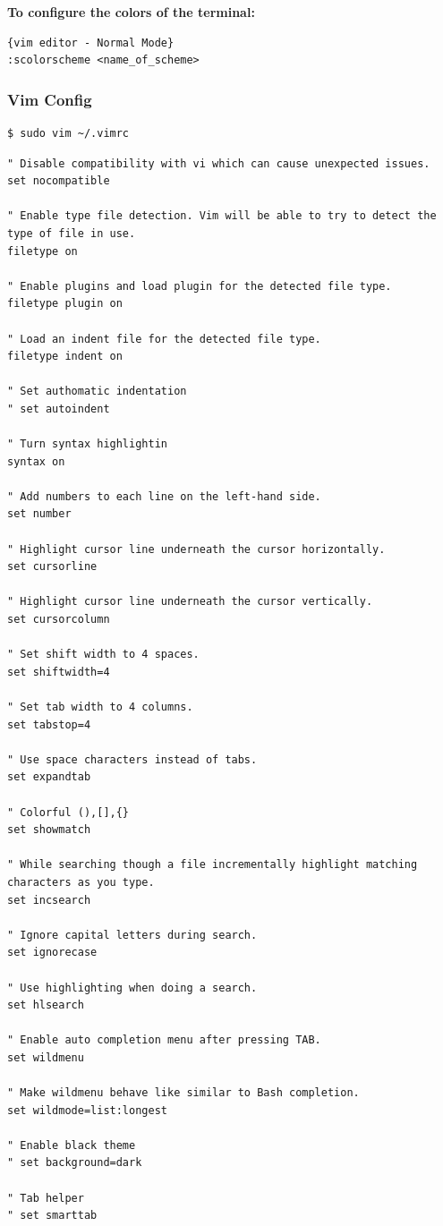 \documentclass{article}
\newenvironment{codetemplate}[1][]{%
  \mybasecolorbox[#1]
  \itshape
}{%
  \endmybasecolorbox
}
\begin{document}
\textbf{To configure the colors of the terminal:}


\begin{codetemplate}
\begin{verbatim}{vim editor - Normal Mode}
:scolorscheme <name_of_scheme>
\end{verbatim}
\end{codetemplate}

\subsubsection{Vim Config}

\begin{codetemplate}{}
\begin{verbatim}
$ sudo vim ~/.vimrc
\end{verbatim}
\end{codetemplate}

\begin{codetemplate}{}
\begin{verbatim}
" Disable compatibility with vi which can cause unexpected issues.
set nocompatible

" Enable type file detection. Vim will be able to try to detect the type of file in use.
filetype on

" Enable plugins and load plugin for the detected file type.
filetype plugin on

" Load an indent file for the detected file type.
filetype indent on

" Set authomatic indentation
" set autoindent

" Turn syntax highlightin
syntax on

" Add numbers to each line on the left-hand side.
set number

" Highlight cursor line underneath the cursor horizontally.
set cursorline

" Highlight cursor line underneath the cursor vertically.
set cursorcolumn

" Set shift width to 4 spaces.
set shiftwidth=4

" Set tab width to 4 columns.
set tabstop=4

" Use space characters instead of tabs.
set expandtab

" Colorful (),[],{}
set showmatch

" While searching though a file incrementally highlight matching characters as you type.
set incsearch

" Ignore capital letters during search.
set ignorecase

" Use highlighting when doing a search.
set hlsearch

" Enable auto completion menu after pressing TAB.
set wildmenu

" Make wildmenu behave like similar to Bash completion.
set wildmode=list:longest

" Enable black theme
" set background=dark

" Tab helper
" set smarttab
\end{verbatim}
\end{codetemplate}
\end{document}
